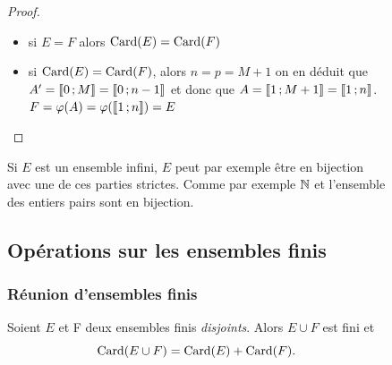 \begin{figure}
\begin{proof}
\begin{enumerate}
    \begin{itemize}
    \item si \(E=F\) alors \(\operatorname{Card}(E)=\operatorname{Card}(F)\)
    \item si \(\operatorname{Card}(E)=\operatorname{Card}(F)\), alors \(n=p=M+1\) on en déduit que \(A'=\mathopen{\llbracket}0\mathclose{}\mathpunct{};M\mathclose{\rrbracket} = \mathopen{\llbracket}0\mathclose{}\mathpunct{};n-1\mathclose{\rrbracket}\) et donc que \(A=\mathopen{\llbracket}1\mathclose{}\mathpunct{};M+1\mathclose{\rrbracket} = \mathopen{\llbracket}1\mathclose{}\mathpunct{};n\mathclose{\rrbracket}\). \(F=\varphi(A)=\varphi(\mathopen{\llbracket}1\mathclose{}\mathpunct{};n\mathclose{\rrbracket})=E\)
    \end{itemize}
  \end{enumerate}
\end{proof}

Si \(E\) est un ensemble infini, \(E\) peut par exemple être en bijection avec une de ces parties strictes. Comme par exemple \(\mathbb{N}\) et l'ensemble des entiers pairs sont en bijection.

\subsection{Opérations sur les ensembles finis}

\subsubsection{Réunion d'ensembles finis}

\begin{prop}\label{prop:reunionfindis}
  Soient \(E\) et F deux ensembles finis \emph{disjoints}. Alors \(E\cup F\) est fini et 
  \begin{equation}
    \operatorname{Card}(E\cup F)=\operatorname{Card}(E)+\operatorname{Card}(F).
  \end{equation}
\end{prop}


\end{figure}
